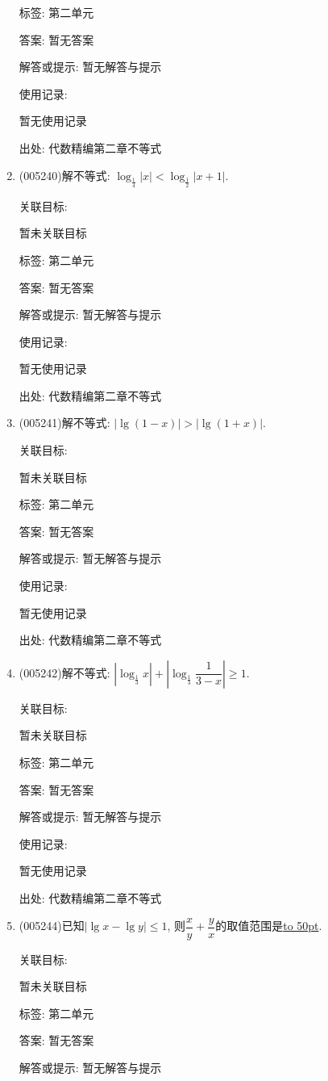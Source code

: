 \documentclass[10pt,a4paper]{article}
\newcommand{\blank}[1]{\underline{\hbox to #1pt{}}}
\begin{document}
\begin{enumerate}[1.]
标签: 第二单元

答案: 暂无答案

解答或提示: 暂无解答与提示

使用记录:

暂无使用记录


出处: 代数精编第二章不等式
\item { (005240)}解不等式: $\log_{\frac 14}|x|<\log_{\frac 12}|x+1|$.


关联目标:

暂未关联目标



标签: 第二单元

答案: 暂无答案

解答或提示: 暂无解答与提示

使用记录:

暂无使用记录


出处: 代数精编第二章不等式
\item { (005241)}解不等式: $|\lg (1-x)|>|\lg (1+x)|$.


关联目标:

暂未关联目标



标签: 第二单元

答案: 暂无答案

解答或提示: 暂无解答与提示

使用记录:

暂无使用记录


出处: 代数精编第二章不等式
\item { (005242)}解不等式: $|\log_{\frac 13}x|+|\log_{\frac 13}\dfrac 1{3-x}|\ge 1$.


关联目标:

暂未关联目标



标签: 第二单元

答案: 暂无答案

解答或提示: 暂无解答与提示

使用记录:

暂无使用记录


出处: 代数精编第二章不等式
\item { (005244)}已知$|\lg x-\lg y|\le 1$, 则$\dfrac xy+\dfrac yx$的取值范围是\blank{50}.


关联目标:

暂未关联目标



标签: 第二单元

答案: 暂无答案

解答或提示: 暂无解答与提示


\end{enumerate}
\end{document}
